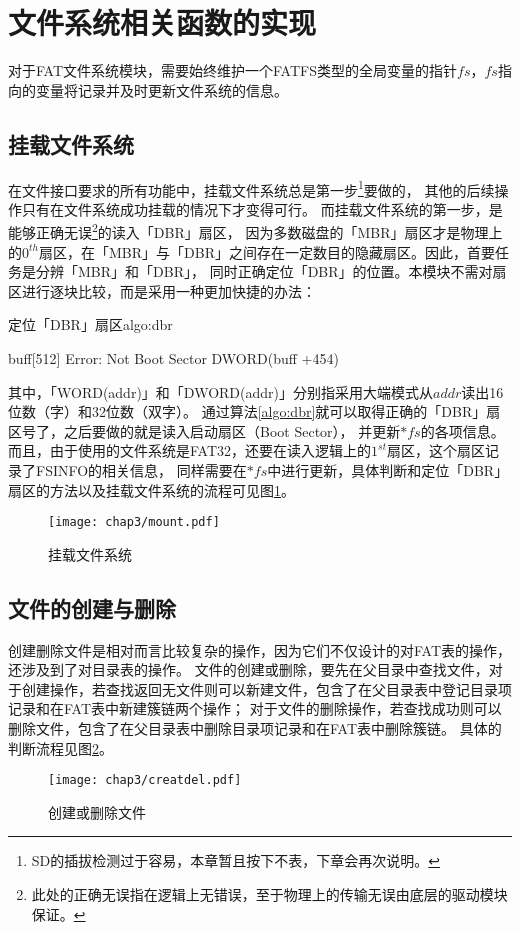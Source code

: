 \section{文件系统相关函数的实现}
\label{sec:Function}
对于FAT文件系统模块，需要始终维护一个FATFS类型的全局变量的指针$fs$，$fs$指向的变量将记录并及时更新文件系统的信息。
\subsection{挂载文件系统}
\label{sec:Mount}
在文件接口要求的所有功能中，挂载文件系统总是第一步\footnote{SD的插拔检测过于容易，本章暂且按下不表，下章会再次说明。}要做的，
其他的后续操作只有在文件系统成功挂载的情况下才变得可行。
而挂载文件系统的第一步，是能够正确无误\footnote{此处的正确无误指在逻辑上无错误，至于物理上的传输无误由底层的驱动模块保证。}的读入「DBR」扇区，
因为多数磁盘的「MBR」扇区才是物理上的$0^{th}$扇区，在「MBR」与「DBR」之间存在一定数目的隐藏扇区。因此，首要任务是分辨「MBR」和「DBR」，
同时正确定位「DBR」的位置。本模块不需对扇区进行逐块比较，而是采用一种更加快捷的办法：
\begin{balgo}{定位「DBR」扇区}{algo:dbr}
\begin{algorithmic}
\Require buff[512]
    \State \Return Error: Not Boot Sector
 
    \State \Return DWORD(buff $+$454)
\EndIf
\end{algorithmic}
\end{balgo}

其中，「WORD(addr)」和「DWORD(addr)」分别指采用大端模式从$addr$读出16位数（字）和32位数（双字）。
通过算法\ref{algo:dbr}就可以取得正确的「DBR」扇区号了，之后要做的就是读入启动扇区（Boot Sector），
并更新$*fs$的各项信息。而且，由于使用的文件系统是FAT32，还要在读入逻辑上的$1^{st}$扇区，这个扇区记录了FSINFO的相关信息，
同样需要在$*fs$中进行更新，具体判断和定位「DBR」扇区的方法以及挂载文件系统的流程可见图\ref{fig:fsmount}。
\begin{figure}[!htb]
    \centering
    \texttt{[image: chap3/mount.pdf]}
    \\
    \caption{挂载文件系统}\label{fig:fsmount}
\end{figure}

\subsection{文件的创建与删除}
\label{sec:Create}
创建删除文件是相对而言比较复杂的操作，因为它们不仅设计的对FAT表的操作，还涉及到了对目录表的操作。
文件的创建或删除，要先在父目录中查找文件，对于创建操作，若查找返回无文件则可以新建文件，包含了在父目录表中登记目录项记录和在FAT表中新建簇链两个操作；
对于文件的删除操作，若查找成功则可以删除文件，包含了在父目录表中删除目录项记录和在FAT表中删除簇链。
具体的判断流程见图\ref{fig:crtdel}。
\begin{figure}[!htb]
    \centering
    \texttt{[image: chap3/creatdel.pdf]}
    \\
    \caption{创建或删除文件}\label{fig:crtdel}
\end{figure}
